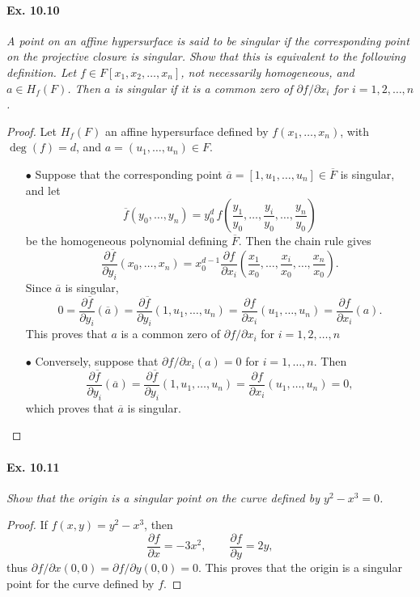 \documentclass[11pt,a4paper]{article}
\begin{document}
\paragraph{Ex. 10.10} {\it A point on an affine hypersurface is said to be singular if the corresponding point on the projective closure is singular. Show that this is equivalent to the following definition. Let $f \in F[x_1,x_2,\ldots,x_n]$, not necessarily homogeneous, and $a \in H_f(F)$. Then $a$ is singular if it is a common zero of $\partial f/\partial x_i$ for $i=1,2,\ldots,n$.
}

\begin{proof}
Let $H_f(F)$ an affine hypersurface defined by $f(x_1,\ldots,x_n)$, with $\deg(f) = d$, and $a = (u_1,\ldots,u_n) \in F$.
\begin{enumerate} 
\item[$\bullet$] Suppose that the corresponding point $\overline{a} = [1,u_1,\ldots,u_n] \in \overline{F}$ is singular, and let
$$\overline{f}(y_0,\ldots,y_n) = y_0^d\, f\left(\frac{y_1}{y_0},\ldots,\frac{y_i}{y_0},\ldots,\frac{y_n}{y_0}\right)$$
be the homogeneous polynomial defining $\overline{F}$. Then the chain rule gives
$$\frac{\partial \overline{f}}{\partial y_i}(x_0,\ldots,x_n) = x_0^{d-1} \frac{\partial f}{\partial x_i}\left(\frac{x_1}{x_0},\ldots,\frac{x_i}{x_0},\ldots,\frac{x_n}{x_0}\right).$$
Since $\overline{a}$ is singular,
$$0 =  \frac{\partial \overline{f}}{\partial y_i}(\overline{a}) = \frac{\partial \overline{f}}{\partial y_i}(1,u_1,\ldots,u_n) = \frac{\partial f}{\partial x_i} (u_1,\ldots,u_n) =\frac{\partial f}{\partial x_i}(a).$$
This proves that $a$ is a common zero of $\partial f/\partial x_i$ for $i=1,2,\ldots,n$
\item[$\bullet$] Conversely, suppose that $\partial f/\partial x_i (a) = 0$ for $i=1,\ldots,n$. Then 
$$\frac{\partial \overline{f}}{\partial y_i}(\overline{a}) = \frac{\partial \overline{f}}{\partial y_i}(1,u_1,\ldots,u_n) =\frac{\partial f}{\partial x_i} (u_1,\ldots,u_n) =0,$$
which proves that $\overline{a}$ is singular.
\end{enumerate}
\end{proof}

\paragraph{Ex. 10.11} {\it Show that the origin is a singular point on the curve defined by $y^2 - x^3 = 0$.
}
\begin{proof}
If $f(x,y) = y^2 - x^3$, then
$$\frac{\partial f}{\partial x}  = -3x^2,\qquad \frac{\partial f}{\partial y} = 2y,$$
thus $\partial f/\partial x (0,0) = \partial f/\partial y (0,0) = 0$. This proves that the origin is a singular point for the curve defined by $f$.
\end{proof}
\end{document}
